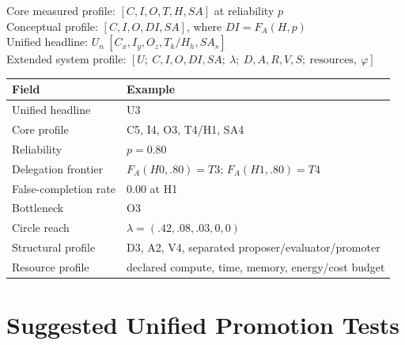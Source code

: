 \documentclass[11pt]{article}
\theoremstyle{definition}
\newcommand{\FA}{\ensuremath{F_A(H,p)}}
\begin{document}
\begin{center}
Core measured profile: $[C, I, O, T, H, SA]$ at reliability $p$\\
Conceptual profile: $[C, I, O, DI, SA]$, where $DI = \FA{}$\\
Unified headline: $U_n\ [C_x, I_y, O_z, T_k/H_h, SA_s]$\\
Extended system profile: $[U;\ C,I,O,DI,SA;\ \lambda;\ D,A,R,V,S;\ \text{resources},\ \varphi]$
\end{center}

\begin{table}[h]
\centering\small
\begin{tabularx}{\textwidth}{@{}lY@{}}
\toprule
Field & Example \\
\midrule
Unified headline & U3 \\
Core profile & C5, I4, O3, T4/H1, SA4 \\
Reliability & $p = 0.80$ \\
Delegation frontier & $F_A(H0,.80)=T3$; $F_A(H1,.80)=T4$ \\
False-completion rate \emph{} & 0.00 at H1 \\
Bottleneck & O3 \\
Circle reach & $\lambda = (.42,.08,.03,0,0)$ \\
Structural profile & D3, A2, V4, separated proposer/evaluator/promoter \\
Resource profile & declared compute, time, memory, energy/cost budget \\
\bottomrule
\end{tabularx}
\end{table}

\section{Suggested Unified Promotion Tests}
\end{document}
